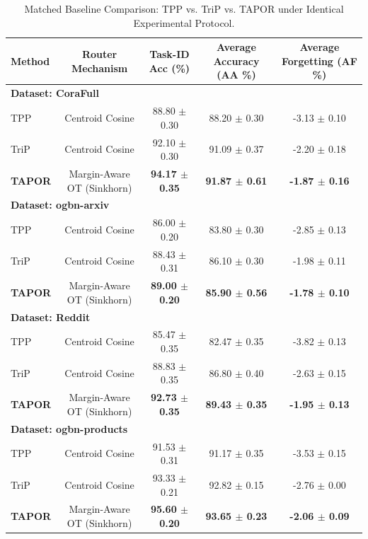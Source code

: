 \begin{table}[t]
\centering
\caption{Matched Baseline Comparison: TPP vs. TriP vs. TAPOR under Identical Experimental Protocol.}
\begin{tabular}{lcccc}
\hline
\textbf{Method} & \textbf{Router Mechanism} & \textbf{Task-ID Acc (\%)} & \textbf{Average Accuracy (AA \%)} & \textbf{Average Forgetting (AF \%)} \\
\hline
\multicolumn{5}{l}{\textbf{Dataset: CoraFull}} \\
TPP & Centroid Cosine & 88.80 $\pm$ 0.30 & 88.20 $\pm$ 0.30 & -3.13 $\pm$ 0.10 \\
TriP & Centroid Cosine & 92.10 $\pm$ 0.30 & 91.09 $\pm$ 0.37 & -2.20 $\pm$ 0.18 \\
\textbf{TAPOR} & Margin-Aware OT (Sinkhorn) & \textbf{94.17 $\pm$ 0.35} & \textbf{91.87 $\pm$ 0.61} & \textbf{-1.87 $\pm$ 0.16} \\
\hline
\multicolumn{5}{l}{\textbf{Dataset: ogbn-arxiv}} \\
TPP & Centroid Cosine & 86.00 $\pm$ 0.20 & 83.80 $\pm$ 0.30 & -2.85 $\pm$ 0.13 \\
TriP & Centroid Cosine & 88.43 $\pm$ 0.31 & 86.10 $\pm$ 0.30 & -1.98 $\pm$ 0.11 \\
\textbf{TAPOR} & Margin-Aware OT (Sinkhorn) & \textbf{89.00 $\pm$ 0.20} & \textbf{85.90 $\pm$ 0.56} & \textbf{-1.78 $\pm$ 0.10} \\
\hline
\multicolumn{5}{l}{\textbf{Dataset: Reddit}} \\
TPP & Centroid Cosine & 85.47 $\pm$ 0.35 & 82.47 $\pm$ 0.35 & -3.82 $\pm$ 0.13 \\
TriP & Centroid Cosine & 88.83 $\pm$ 0.35 & 86.80 $\pm$ 0.40 & -2.63 $\pm$ 0.15 \\
\textbf{TAPOR} & Margin-Aware OT (Sinkhorn) & \textbf{92.73 $\pm$ 0.35} & \textbf{89.43 $\pm$ 0.35} & \textbf{-1.95 $\pm$ 0.13} \\
\hline
\multicolumn{5}{l}{\textbf{Dataset: ogbn-products}} \\
TPP & Centroid Cosine & 91.53 $\pm$ 0.31 & 91.17 $\pm$ 0.35 & -3.53 $\pm$ 0.15 \\
TriP & Centroid Cosine & 93.33 $\pm$ 0.21 & 92.82 $\pm$ 0.15 & -2.76 $\pm$ 0.00 \\
\textbf{TAPOR} & Margin-Aware OT (Sinkhorn) & \textbf{95.60 $\pm$ 0.20} & \textbf{93.65 $\pm$ 0.23} & \textbf{-2.06 $\pm$ 0.09} \\
\hline
\end{tabular}
\label{tab:matched_tpp_baseline}
\end{table}